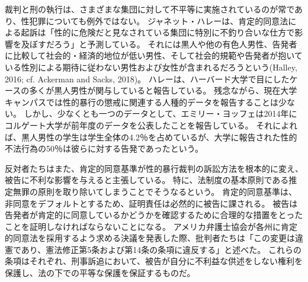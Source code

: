 \documentclass[paper=a4,book,openany]{jlreq}
\newcommand{\ig}[1]{}           %
\begin{document}
裁判と刑の執行は、さまざまな集団に対して不平等に実施されているのが常であり、性犯罪についても例外ではない。
ジャネット・ハレー\ig{Janet Halley}は、肯定的同意法による起訴は「性的に危険だと見なされている集団に特別に不釣り合いな仕方で影響を及ぼすだろう」と予測している。
それには黒人や他の有色人男性、告発者に比較して社会的・経済的地位が低い男性、そして社会的規範や告発者が抱いている性別による期待に従わない男性および女性が含まれるだろうという(Halley, 2016; cf. Ackerman and Sacks, 2018)\nocite{ackerman18:_dispr_minor_presen_u}。
ハレーは、ハーバード大学で目にしたケースの多くが黒人男性が関与していると報告している\citep[cf.][]{halley15:_tradin_megap_gavel_title_ix_enfor}。
残念ながら、現在大学キャンパスでは性的暴行の懲戒に関連する人種的データを報告することは少ない。
しかし、少なくとも一つのデータとして、エミリー・ヨッフェ\ig{Emily Yoffe}は2014年にコルゲート大学が前年度のデータを公表したことを報告している。
それによれば、黒人男性の学生は学生全体の4.2％を占めているが、大学に報告された性的不法行為の50％は彼らに対する告発であったという\citep{yoffe17:_quest_race_campus_sexual_assaul_cases}。

反対者たちはまた、肯定的同意基準が性的暴行裁判の訴訟方法を根本的に変え、被告に不利な影響を与えると主張している。
特に、法制度の基本原則である推定無罪の原則を取り除いてしまうことでそうなるという。
肯定的同意基準は、非同意をデフォルトとするため、証明責任は必然的に被告に課される。
被告は告発者が肯定的に同意しているかどうかを確認するために合理的な措置をとったことを証明しなければならないことになる。
アメリカ弁護士協会が各州に肯定的同意法を採用するよう求める決議を発表した際、批判者たちは「この変更は違憲であり、憲法修正第5条および第14条の条項に違反する」と述べた。
これらの条項はそれぞれ、刑事訴追において、被告が自分に不利益な供述をしない権利を保護し、法の下での平等な保護を保証するものだ\citep{bauer-wolf19:_lawyer_group_disag_colleg_model_affir_consen}。
\end{document}
